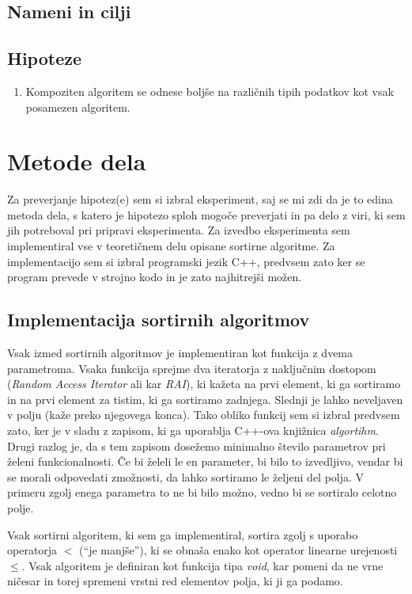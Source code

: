 \documentclass[a4paper,oneside]{article}
\begin{document}
\subsection{Nameni in cilji}
\subsection{Hipoteze}
\begin{enumerate}
  \item Kompoziten algoritem se odnese boljše na različnih tipih podatkov kot vsak
    posamezen algoritem.
\end{enumerate}
\section{Metode dela}
Za preverjanje hipotez(e) sem si izbral eksperiment, saj se mi zdi da je to edina metoda
dela, s katero je hipotezo sploh mogoče preverjati in pa delo z viri, ki sem jih
potreboval pri pripravi eksperimenta.
Za izvedbo eksperimenta sem implementiral vse v teoretičnem delu opisane sortirne
algoritme. Za implementacijo sem si izbral programski jezik C++, predvsem zato
ker se program prevede v strojno kodo in je zato najhitrejši možen. 

\subsection{Implementacija sortirnih algoritmov}
\label{chapter:sortimplementation}
Vsak izmed sortirnih algoritmov je implementiran kot funkcija z dvema parametroma.
Vsaka funkcija sprejme dva iteratorja z naključnim dostopom (\emph{Random Access
Iterator} ali kar \emph{RAI}),
ki kažeta na prvi element, ki ga sortiramo in na prvi element za tistim, ki ga sortiramo
zadnjega. Slednji je lahko neveljaven v polju (kaže preko njegovega konca).
Tako obliko funkcij sem si izbral predvsem zato, ker je v sladu z zapisom, ki ga uporablja
C++-ova knjižnica \emph{algortihm}. Drugi razlog je, da s tem zapisom dosežemo minimalno število
parametrov pri želeni funkcionalnosti. Če bi želeli le en parameter, bi bilo to
izvedljivo, vendar bi se morali odpovedati zmožnosti, da lahko sortiramo le željeni
del polja. V primeru zgolj enega parametra to ne bi bilo možno, vedno bi se
sortiralo celotno polje.

Vsak sortirni algoritem, ki sem ga implementiral, sortira zgolj s uporabo operatorja $<$
(``je manjše''), ki se obnaša enako kot operator linearne urejenosti $\leq$. Vsak
algoritem je definiran kot funkcija tipa \emph{void}, kar pomeni da ne vrne ničesar in
torej spremeni vrstni red elementov polja, ki ji ga podamo.
\end{document}
